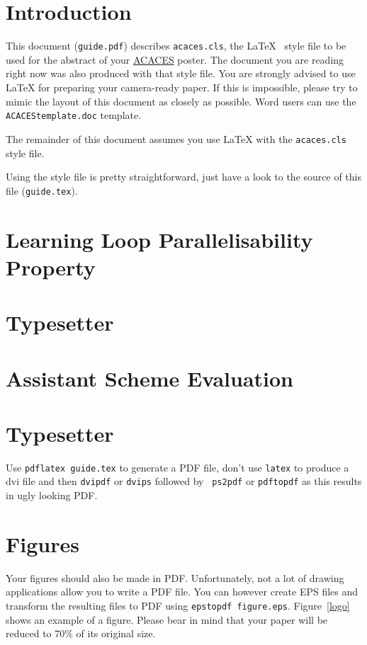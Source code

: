 \documentclass{acaces}
\begin{document}

\section{Introduction}
This document ({\tt guide.pdf}) describes {\tt acaces.cls}, the
\LaTeX~\cite{latex} style file to be used for the abstract of your 
\href{http://www.hipeac.net/acaces2006/}{ACACES} poster. The document
you are reading right now was also produced with that style file.
You are strongly advised to use \LaTeX{} for preparing your camera-ready paper.
If this is impossible, please try to mimic the layout of this document as
closely as possible. Word users can use the {\tt
ACACEStemplate.doc} template.

The remainder of this document assumes you use \LaTeX{} with the
{\tt acaces.cls} style file.

Using the style file is pretty straightforward, just have a look to the source of this file 
({\tt guide.tex}).

\section{Learning Loop Parallelisability Property}


\section{Typesetter}


\section{Assistant Scheme Evaluation}


\section{Typesetter}

Use {\tt pdflatex guide.tex} to generate a PDF file, don't use {\tt latex} to
produce a dvi file and then {\tt dvipdf} or {\tt dvips} followed by {\tt
ps2pdf} or {\tt pdftopdf} as this results in ugly looking PDF.

\section{Figures} 
Your figures should also be made in PDF. Unfortunately, not a
lot of drawing applications allow you to write a PDF file. You can however
create EPS files and transform the resulting files to PDF using {\tt epstopdf
figure.eps}. Figure~\ref{logo} shows an example of a figure.
Please bear in mind that your paper will be reduced to 70\% of its
original size.
\end{document}
